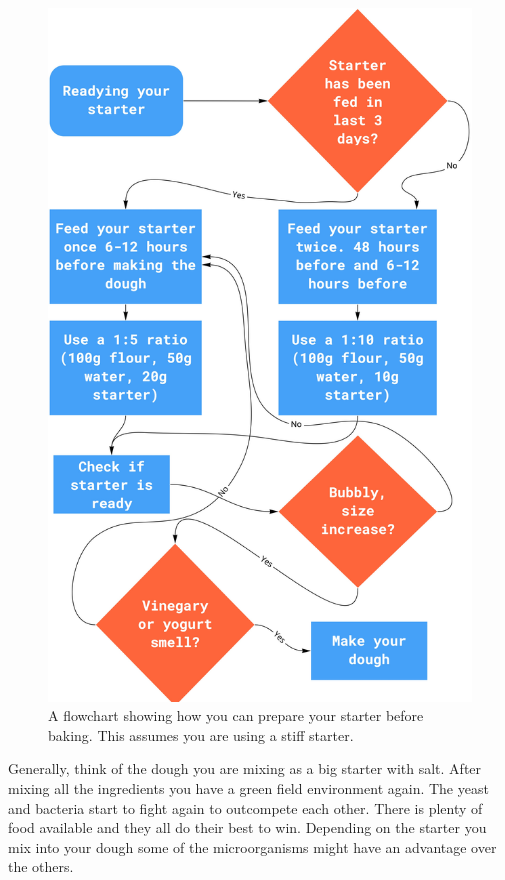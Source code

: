 \begin{figure}[!p]
  \centering
  \includegraphics[width=\textwidth]{1-ready-starter}
  \caption[Readying a starter]{A flowchart showing how you can prepare your starter before baking.
  This assumes you are using a stiff starter.}
\end{figure}

Generally, think of the dough you are mixing as a big starter with salt.
After mixing all the ingredients you have a green field environment again.
The yeast and bacteria start to fight again to outcompete each other.
There is plenty of food available and they all do their best to win.
Depending on the starter you mix into your dough some of the microorganisms
might have an advantage over the others.

